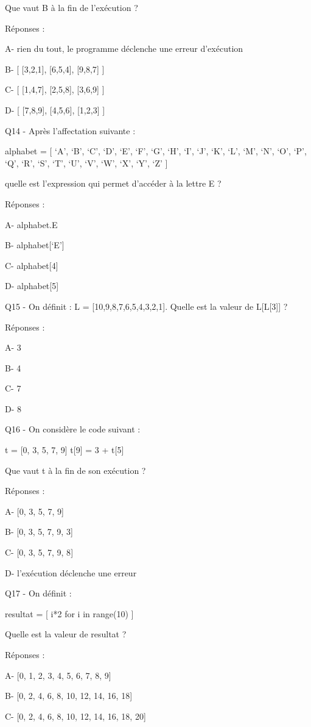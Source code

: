 \documentclass[
]{book}
\begin{document}
Que vaut B à la fin de l'exécution ?

Réponses :

A- rien du tout, le programme déclenche une erreur d'exécution

B- {[} {[}3,2,1{]}, {[}6,5,4{]}, {[}9,8,7{]} {]}

C- {[} {[}1,4,7{]}, {[}2,5,8{]}, {[}3,6,9{]} {]}

D- {[} {[}7,8,9{]}, {[}4,5,6{]}, {[}1,2,3{]} {]}

Q14 - Après l'affectation suivante :

alphabet = {[} `A', `B', `C', `D', `E', `F', `G', `H', `I', `J', `K', `L', `M', `N', `O', `P', `Q', `R', `S', `T', `U', `V', `W', `X', `Y', `Z' {]}

quelle est l'expression qui permet d'accéder à la lettre E ?

Réponses :

A- alphabet.E

B- alphabet{[}`E'{]}

C- alphabet{[}4{]}

D- alphabet{[}5{]}

Q15 - On définit : L = {[}10,9,8,7,6,5,4,3,2,1{]}. Quelle est la valeur de L{[}L{[}3{]}{]} ?

Réponses :

A- 3

B- 4

C- 7

D- 8

Q16 - On considère le code suivant :

t = {[}0, 3, 5, 7, 9{]}
t{[}9{]} = 3 + t{[}5{]}

Que vaut t à la fin de son exécution ?

Réponses :

A- {[}0, 3, 5, 7, 9{]}

B- {[}0, 3, 5, 7, 9, 3{]}

C- {[}0, 3, 5, 7, 9, 8{]}

D- l'exécution déclenche une erreur

Q17 - On définit :

resultat = {[} i*2 for i in range(10) {]}

Quelle est la valeur de resultat ?

Réponses :

A- {[}0, 1, 2, 3, 4, 5, 6, 7, 8, 9{]}

B- {[}0, 2, 4, 6, 8, 10, 12, 14, 16, 18{]}

C- {[}0, 2, 4, 6, 8, 10, 12, 14, 16, 18, 20{]}
\end{document}
